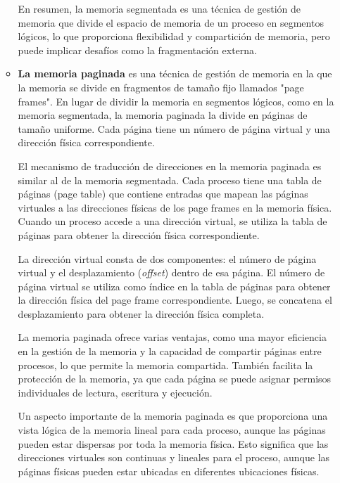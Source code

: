 \documentclass[../main.tex]{subfiles}
\begin{document}
\begin{enumerate}
\begin{itemize}
                        En resumen, la memoria segmentada es una técnica de gestión de memoria que divide el espacio de memoria de un proceso en segmentos lógicos, lo que proporciona flexibilidad y compartición de memoria, pero puede implicar desafíos como la fragmentación externa.
                    \item 
                        \textbf{La memoria paginada} es una técnica de gestión de memoria en la que la memoria se divide en fragmentos de tamaño fijo llamados "page frames". En lugar de dividir la memoria en segmentos lógicos, como en la memoria segmentada, la memoria paginada la divide en páginas de tamaño uniforme. Cada página tiene un número de página virtual y una dirección física correspondiente.

                        El mecanismo de traducción de direcciones en la memoria paginada es similar al de la memoria segmentada. Cada proceso tiene una tabla de páginas (page table) que contiene entradas que mapean las páginas virtuales a las direcciones físicas de los page frames en la memoria física. Cuando un proceso accede a una dirección virtual, se utiliza la tabla de páginas para obtener la dirección física correspondiente.
                        
                        La dirección virtual consta de dos componentes: el número de página virtual y el desplazamiento (\textit{offset}) dentro de esa página. El número de página virtual se utiliza como índice en la tabla de páginas para obtener la dirección física del page frame correspondiente. Luego, se concatena el desplazamiento para obtener la dirección física completa.
                        
                        La memoria paginada ofrece varias ventajas, como una mayor eficiencia en la gestión de la memoria y la capacidad de compartir páginas entre procesos, lo que permite la memoria compartida. También facilita la protección de la memoria, ya que cada página se puede asignar permisos individuales de lectura, escritura y ejecución.
                        
                        Un aspecto importante de la memoria paginada es que proporciona una vista lógica de la memoria lineal para cada proceso, aunque las páginas pueden estar dispersas por toda la memoria física. Esto significa que las direcciones virtuales son continuas y lineales para el proceso, aunque las páginas físicas pueden estar ubicadas en diferentes ubicaciones físicas.
                        

\end{itemize}
\end{enumerate}
\end{document}
